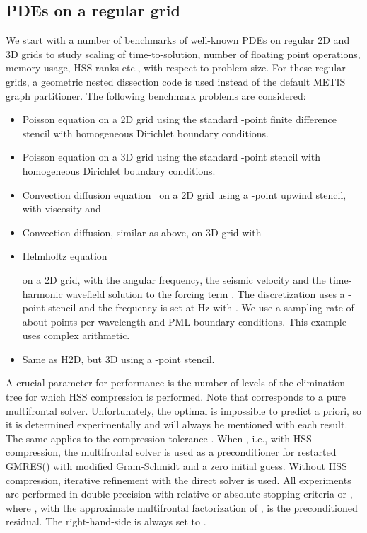 \documentclass{article}
\begin{document}
\subsection{PDEs on a regular grid}\label{sec:exp_pde}
We start with a number of benchmarks of well-known PDEs on regular 2D
and 3D grids to study scaling of time-to-solution, number of floating
point operations, memory usage, HSS-ranks etc., with respect to
problem size. For these regular grids, a geometric nested dissection
code is used instead of the default METIS graph partitioner. The
following benchmark problems are considered:
\begin{itemize}
\item Poisson equation  on a 2D grid using the standard
  -point finite difference stencil with homogeneous Dirichlet
  boundary conditions.
\item Poisson equation on a 3D grid using the standard -point
  stencil with homogeneous Dirichlet boundary conditions.
\item Convection diffusion equation~\cite{agmg}  on a 2D grid using a -point upwind
  stencil, with viscosity  and
  
\item Convection diffusion, similar as above, on 3D grid with
  
\item Helmholtz equation
  
  on a 2D grid, with  the angular frequency,  the
  seismic velocity and  the time-harmonic wavefield
  solution to the forcing term . The discretization uses
  a -point stencil and the frequency is set at Hz with
  . We use a sampling rate of about  points per
  wavelength and PML boundary conditions. This example uses complex
  arithmetic.
\item Same as H2D, but 3D using a -point stencil.
\end{itemize}

A crucial parameter for performance is the number of levels 
of the elimination tree for which HSS compression is performed. Note
that  corresponds to a pure multifrontal
solver. Unfortunately, the optimal  is impossible to predict a
priori, so it is determined experimentally and will always be
mentioned with each result. The same applies to the compression tolerance
. When , i.e., with HSS compression, the multifrontal solver
is used as a preconditioner for restarted GMRES() with modified
Gram-Schmidt and a zero initial guess. Without HSS compression,
iterative refinement with the direct solver is used. All experiments
are performed in double precision with relative or absolute stopping
criteria  or , where , with  the approximate
multifrontal factorization of , is the preconditioned residual. The
right-hand-side is always set to .
\end{document}
